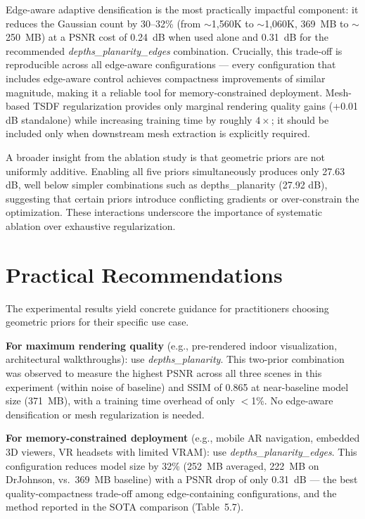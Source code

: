 Edge-aware adaptive densification is the most practically impactful component: it reduces the Gaussian count by 30--32\% (from $\sim$1{,}560K to $\sim$1{,}060K, 369~MB to $\sim$250~MB) at a PSNR cost of 0.24~dB when used alone and 0.31~dB for the recommended \textit{depths\_\allowbreak planarity\_\allowbreak edges} combination. Crucially, this trade-off is reproducible across all edge-aware configurations — every configuration that includes edge-aware control achieves compactness improvements of similar magnitude, making it a reliable tool for memory-constrained deployment. Mesh-based TSDF regularization provides only marginal rendering quality gains (+0.01 dB standalone) while increasing training time by roughly $4\times$; it should be included only when downstream mesh extraction is explicitly required.

A broader insight from the ablation study is that geometric priors are not uniformly additive. Enabling all five priors simultaneously produces only 27.63 dB, well below simpler combinations such as depths\_\allowbreak planarity (27.92 dB), suggesting that certain priors introduce conflicting gradients or over-constrain the optimization. These interactions underscore the importance of systematic ablation over exhaustive regularization.

\section{Practical Recommendations}

The experimental results yield concrete guidance for practitioners choosing geometric priors for their specific use case.

\textbf{For maximum rendering quality} (e.g., pre-rendered indoor visualization, architectural walkthroughs): use \textit{depths\_\allowbreak planarity}. This two-prior combination was observed to measure the highest PSNR across all three scenes in this experiment (within noise of baseline) and SSIM of 0.865 at near-baseline model size (371~MB), with a training time overhead of only $<$1\%. No edge-aware densification or mesh regularization is needed.

\textbf{For memory-constrained deployment} (e.g., mobile AR navigation, embedded 3D viewers, VR headsets with limited VRAM): use \textit{depths\_\allowbreak planarity\_\allowbreak edges}. This configuration reduces model size by 32\% (252~MB averaged, 222~MB on DrJohnson, vs.\ 369~MB baseline) with a PSNR drop of only 0.31~dB — the best quality-compactness trade-off among edge-containing configurations, and the method reported in the SOTA comparison (Table~5.7).

